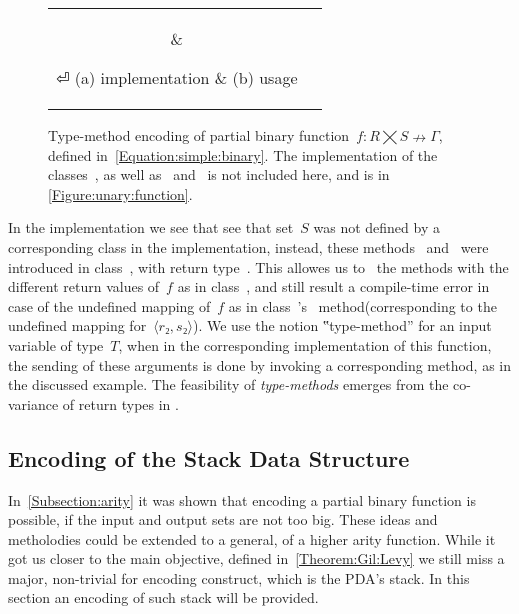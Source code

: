 \begin{figure}[hbt]
  \caption{\label{Figure:simple:binary}
  Type-method encoding of partial binary function~$f: R⨉S↛Γ$,
  defined in~\cref{Equation:simple:binary}. The implementation of the classes~, 
  as well as~ and~ is not included here, and is
  in \cref{Figure:unary:function}.}

  \begin{tabular}{cc}
   \parbox[c]{0.42\linewidth}{
   }
   &
   \parbox[c]{0.58\linewidth}{
   }
⏎
   \hspace{-7ex}(a) implementation & \hspace{-7ex}(b) usage
  \end{tabular}
\end{figure}

In the implementation we see that see that set~$S$ was not defined by a corresponding class in
  the implementation, instead, these methods~ and~ were introduced in
  class~, with return type~.
This allowes us to~ the methods with the different return values of~$f$ as
 in class~, and still result a compile-time error in case of the undefined mapping of~$f$
 as in class~'s~ method(corresponding to the undefined mapping for~$⟨r₂, s₂⟩$).
We use the notion ‟type-method” for an input variable of type~$T$, when in the
  corresponding implementation of this function, the sending of these arguments is done
  by invoking a corresponding method, as in the discussed example.
The feasibility of \emph{type-methods} emerges from the co-variance of return types in
  \Java.


\subsection{Encoding of the Stack Data Structure}
In~\cref{Subsection:arity} it was shown that encoding a partial binary function is possible, if
  the input and output sets are not too big. 
  These ideas and metholodies could be extended to a general, of a higher arity function.
While it got us closer to the main objective, defined in~\cref{Theorem:Gil:Levy} we still miss a major, 
  non-trivial for encoding construct, which is the PDA's stack.
In this section an encoding of such stack will be provided.

